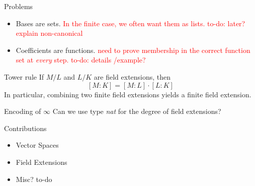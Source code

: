 \documentclass[%
	sans,
	12pt,
]{beamer}
\newcommand{\bad}[1]{\textcolor{red}{#1}}
\begin{document}
\begin{frame}{Problems}
\begin{itemize}
\item Bases are sets.
\bad{In the finite case, we often want them as lists. to-do: later? explain non-canonical}
\item Coefficients are functions.
\bad{need to prove membership in the correct function set at \emph{every} step.
	 to-do: details /example?}
\end{itemize}
\end{frame}

\begin{frame}{Tower rule}
If $M/L$ and $L/K$ are field extensions, then
\[[M : K] = [M : L] \cdot [L : K]\]\pause %
In particular, combining two finite field extensions yields a finite field extension. %
\end{frame}

\begin{frame}{Encoding of $\infty$}
Can we use type \emph{nat} for the degree of field extensions?\pause
{}
\end{frame}

\begin{frame}{Contributions}
\begin{itemize}
	\item Vector Spaces\pause
	\item Field Extensions\pause
	\item Misc? to-do
\end{itemize}
\end{frame}
\end{document}
